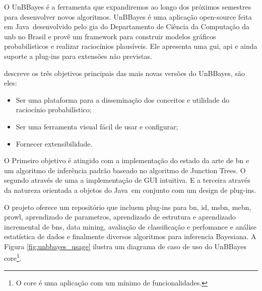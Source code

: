 O UnBBayes é a ferramenta que expandiremos ao longo dos próximos semestres para desenvolver novos algoritmos.
UnBBayes é uma aplicação open-source feita em Java\texttrademark\ desenvolvido pelo \gls{gia} do Departamento de Ciência da Computação da \gls{unb} no Brasil e provê um framework para construir modelos gráficos probabilísticos e realizar raciocínios plausíveis. Ele apresenta uma \gls{gui}, \gls{api} e ainda suporte a plug-ins para extensões não previstas.

\cite[UnBBayes: a Java Framework for probabilistic models in AI]{javaApi11} descreve os três objetivos principais das mais novas versões do UnBBayes, são eles:
\begin{itemize}
	\item Ser uma plataforma para a disseminação dos conceitos e utilidade do raciocínio probabilístico;
	\item Ser uma ferramenta visual fácil de usar e configurar;
	\item Fornecer extensibilidade.
\end{itemize}
O Primeiro objetivo é atingido com a implementação do estado da arte de \gls{bn} e um algoritmo de inferência padrão baseado no algoritmo de Junction Trees. O segundo através de uma a implementação de GUI intuitiva. E a terceira através da natureza orientada a objetos do Java\texttrademark\ em conjunto com um design de plug-ins.

O projeto oferece um repositório que incluem plug-ins para \gls{bn}, \gls{id}, \gls{msbn}, \gls{mebn}, \gls{prowl}, aprendizado de parametros, aprendizado de estrutura e aprendizado incremental de \glspl{bn}, data mining, avaliação de classificação e perfomance e análise estatística de dados e finalmente diversos algoritmos para inferencia Bayesiana. A Figura \ref{fig:unbbayes_usage} ilustra um diagrama de caso de uso do UnBBayes core\footnote{O core é uma aplicação com um mínimo de funcionalidades.}.

